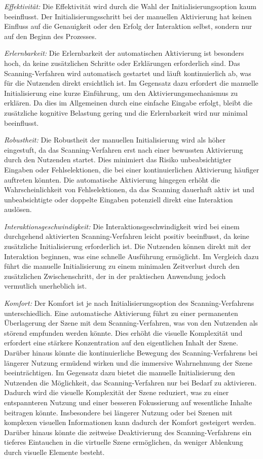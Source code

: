 \textit{Effektivität:}
Die Effektivität wird durch die Wahl der Initialisierungsoption kaum beeinflusst. Der Initialisierungsschritt bei der manuellen Aktivierung hat keinen Einfluss auf die Genauigkeit oder den Erfolg der Interaktion selbst, sondern nur auf den Beginn des Prozesses.

\textit{Erlernbarkeit:}
Die Erlernbarkeit der automatischen Aktivierung ist besonders hoch, da keine zusätzlichen Schritte oder Erklärungen erforderlich sind. Das Scanning-Verfahren wird automatisch gestartet und läuft kontinuierlich ab, was für die Nutzenden direkt ersichtlich ist. Im Gegensatz dazu erfordert die manuelle Initialisierung eine kurze Einführung, um den Aktivierungsmechanismus zu erklären. Da dies im Allgemeinen durch eine einfache Eingabe erfolgt, bleibt die zusätzliche kognitive Belastung gering und die Erlernbarkeit wird nur minimal beeinflusst.

\textit{Robustheit:}
Die Robustheit der manuellen Initialisierung wird als höher eingestuft, da das Scanning-Verfahren erst nach einer bewussten Aktivierung durch den Nutzenden startet. Dies minimiert das Risiko unbeabsichtigter Eingaben oder Fehlselektionen, die bei einer kontinuierlichen Aktivierung häufiger auftreten könnten. Die automatische Aktivierung hingegen erhöht die Wahrscheinlichkeit von Fehlselektionen, da das Scanning dauerhaft aktiv ist und unbeabsichtigte oder doppelte Eingaben potenziell direkt eine Interaktion auslösen.

\textit{Interaktionsgeschwindigkeit:}
Die Interaktionsgeschwindigkeit wird bei einem durchgehend aktivierten Scanning-Verfahren leicht positiv beeinflusst, da keine zusätzliche Initialisierung erforderlich ist. Die Nutzenden können direkt mit der Interaktion beginnen, was eine schnelle Ausführung ermöglicht. Im Vergleich dazu führt die manuelle Initialisierung zu einem minimalen Zeitverlust durch den zusätzlichen Zwischenschritt, der in der praktischen Anwendung jedoch vermutlich unerheblich ist.

\textit{Komfort:}
Der Komfort ist je nach Initialisierungsoption des Scanning-Verfahrens unterschiedlich. Eine automatische Aktivierung führt zu einer permanenten Überlagerung der Szene mit dem Scanning-Verfahren, was von den Nutzenden als störend empfunden werden könnte. Dies erhöht die visuelle Komplexität und erfordert eine stärkere Konzentration auf den eigentlichen Inhalt der Szene. Darüber hinaus könnte die kontinuierliche Bewegung des Scanning-Verfahrens bei längerer Nutzung ermüdend wirken und die immersive Wahrnehmung der Szene beeinträchtigen.
Im Gegensatz dazu bietet die manuelle Initialisierung den Nutzenden die Möglichkeit, das Scanning-Verfahren nur bei Bedarf zu aktivieren. Dadurch wird die visuelle Komplexität der Szene reduziert, was zu einer entspannteren Nutzung und einer besseren Fokussierung auf wesentliche Inhalte beitragen könnte. Insbesondere bei längerer Nutzung oder bei Szenen mit komplexen visuellen Informationen kann dadurch der Komfort gesteigert werden. Darüber hinaus könnte die zeitweise Deaktivierung des Scanning-Verfahrens ein tieferes Eintauchen in die virtuelle Szene ermöglichen, da weniger Ablenkung durch visuelle Elemente besteht.

